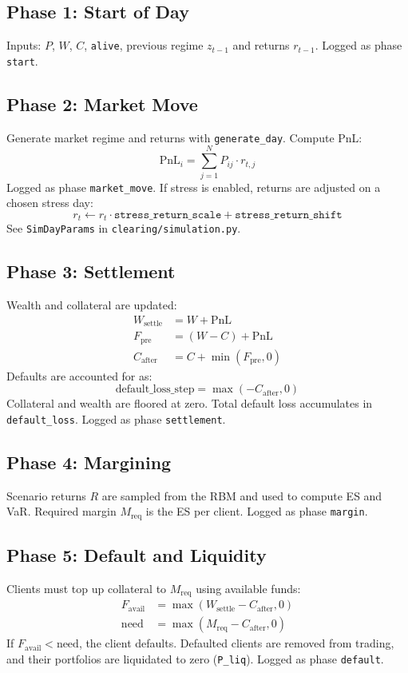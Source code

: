 \documentclass[11pt]{article}
\begin{document}
\subsection{Phase 1: Start of Day}
Inputs: $P$, $W$, $C$, \texttt{alive}, previous regime $z_{t-1}$ and returns $r_{t-1}$.
Logged as phase \texttt{start}.

\subsection{Phase 2: Market Move}
Generate market regime and returns with \texttt{generate\_day}. Compute PnL:
\[
\text{PnL}_i = \sum_{j=1}^N P_{ij} \cdot r_{t,j}
\]
Logged as phase \texttt{market\_move}.
If stress is enabled, returns are adjusted on a chosen stress day:
\[
r_t \leftarrow r_t \cdot \texttt{stress\_return\_scale} + \texttt{stress\_return\_shift}
\]
See \texttt{SimDayParams} in \texttt{clearing/simulation.py}.

\subsection{Phase 3: Settlement}
Wealth and collateral are updated:
\begin{align*}
W_{\text{settle}} &= W + \text{PnL} \\
F_{\text{pre}} &= (W - C) + \text{PnL} \\
C_{\text{after}} &= C + \min(F_{\text{pre}}, 0)
\end{align*}
Defaults are accounted for as:
\[
\text{default\_loss\_step} = \max(-C_{\text{after}}, 0)
\]
Collateral and wealth are floored at zero. Total default loss accumulates in
\texttt{default\_loss}. Logged as phase \texttt{settlement}.

\subsection{Phase 4: Margining}
Scenario returns $R$ are sampled from the RBM and used to compute ES and VaR.
Required margin $M_{\text{req}}$ is the ES per client. Logged as phase \texttt{margin}.

\subsection{Phase 5: Default and Liquidity}
Clients must top up collateral to $M_{\text{req}}$ using available funds:
\begin{align*}
F_{\text{avail}} &= \max(W_{\text{settle}} - C_{\text{after}}, 0) \\
\text{need} &= \max(M_{\text{req}} - C_{\text{after}}, 0)
\end{align*}
If $F_{\text{avail}} < \text{need}$, the client defaults. Defaulted clients are
removed from trading, and their portfolios are liquidated to zero
(\texttt{P\_liq}). Logged as phase \texttt{default}.
\end{document}
